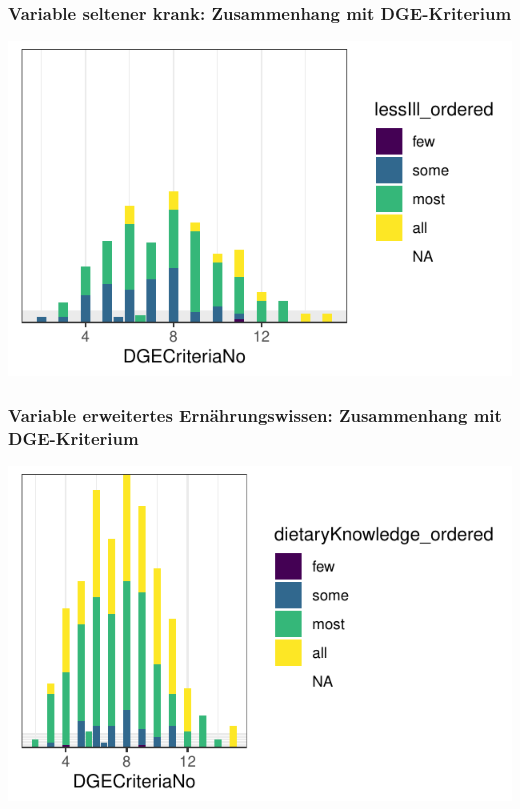 \begin{frame}[fragile]
\frametitle{Variable \glqq seltener krank\grqq: Zusammenhang mit DGE-Kriterium}
\begin{knitrout}\footnotesize
{}\color{fgcolor}

{\centering \includegraphics[width=\maxwidth]{figure/beamer-lessIllDGEplot-1} 

}



\end{knitrout}
\end{frame}

\begin{frame}[fragile]
\frametitle{Variable \glqq erweitertes Ernährungswissen\grqq: Zusammenhang mit DGE-Kriterium}
\begin{knitrout}\footnotesize
{}\color{fgcolor}

{\centering \includegraphics[width=\maxwidth]{figure/beamer-dietaryDGEplot-1} 

}



\end{knitrout}
\end{frame}

